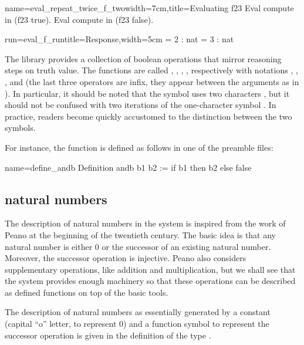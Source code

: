 \begin{coq}{name=eval_repeat_twice_f_two}{width=7cm,title=Evaluating f23}
Eval compute in (f23 true).
Eval compute in (f23 false).
\end{coq}
\begin{coqout}{run=eval_f_run}{title=Response,width=5cm}
  = 2 : nat
  = 3 : nat
\end{coqout}

The \mcbMC{} library provides a collection of boolean operations that
mirror reasoning steps on truth value.  The functions are called
, ,  , , respectively with notations
\C{\~\~},  \C{||}, \C{&&}, and \C{==>} (the last three operators are
infix, they appear between the arguments as in ).
  In
particular, it should be
noted that the symbol \C{\~\~} uses two characters \C{\~}, but it should
not be confused with two iterations of the one-character symbol
\C{\~}.  In practice, readers become quickly accustomed to the
distinction between the two symbols.

For instance, the function  is defined as follows in one of
the preamble files:

\begin{coq}{name=define_andb}{}
Definition andb b1 b2 := if b1 then b2 else false
\end{coq}


\subsection{natural numbers}
The description of natural numbers in the \Coq{} system is inspired from
the work of Peano at the beginning of the twentieth century.  The
basic idea is that any natural number is either 0 or the successor of
an existing natural number.  Moreover, the successor operation is
injective.  Peano also considers supplementary operations, like
addition and multiplication, but we shall see that the \Coq{} system
provides enough machinery so that these operations can be described as
defined functions on top of the basic tools.

The description of natural numbers as essentially generated by a
constant  (capital ``o'' letter, to represent $0$) and a function symbol  to represent 
the successor operation is given in the definition of the type
.

